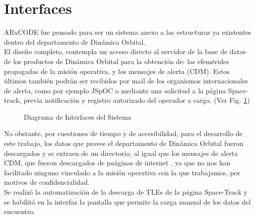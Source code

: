 \section{Interfaces}
ARxCODE fue pensado para ser un sistema anexo a las estructuras ya existentes dentro del departamento de Din\'amica Orbital.\\
El dise\~no completo, contempla un acceso directo al servidor de la base de datos de los productos de Din\'amica Orbital para la obtenci\'on de: las efem\'erides propagadas de la misi\'on operativa, y los mensajes de alerta (CDM). Estos \'ultimos tambi\'en podr\'an ser recibidos por mail de los organismos internacionales de alerta, como por ejemplo JSpOC o mediante una solicitud a la p\'agina Space-track, previa notificaci\'on y registro autorizado del operador a cargo. (Ver Fig. \ref{fig:interfaces})\\

\begin{figure}
\centering
  \caption[Diagrama de Interfaces del Sistema]{Diagrama de Interfaces del Sistema}
  \label{fig:interfaces}
\end{figure}

No obstante, por cuestiones de tiempo y de accesibilidad, para el desarrollo de este trabajo, los datos que provee el departamento de Din\'amica Orbital fueron descargados y se extraen de un directorio, al igual que los mensajes de alerta CDM, que fueron descargados de pa\'aginas de internet , ya que no nos han facilitado ninguno vinculado a la misi\'on operativa con la que trabajamos, por motivos de confidencialidad.\\
Se realiz\'o la automatizaci\'on de la descarga de TLEs de la p\'agina Space-Track y se habilit\'o en la interfaz la pantalla que permite la carga manual de los datos del encuentro.\\


